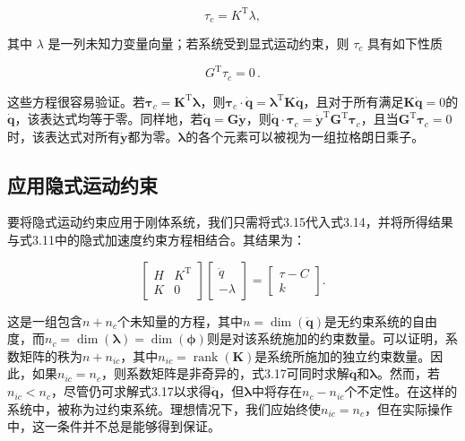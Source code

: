 \documentclass[10pt,a4paper]{book}
\theoremstyle{thmstyle} %
\theoremstyle{defstyle} %
\theoremstyle{prostyle} %
\begin{document}
$$
\tau _ { c } = K ^{\mathrm { T} } \lambda ,
$$



其中 $\lambda$ 是一列未知力变量向量；若系统受到显式运动约束，则 $\tau_{c}$ 具有如下性质



$$
G ^{\mathrm { T} } \tau _ { c } = 0 \, .
$$



这些方程很容易验证。若$\boldsymbol{\tau}_{c}=\boldsymbol{K}^{\mathrm{T}} \boldsymbol{\lambda}$，则$\boldsymbol{\tau}_{c} \cdot \dot{\boldsymbol{q}}=\boldsymbol{\lambda}^{\mathrm{T}} \boldsymbol{K} \dot{\boldsymbol{q}}$，且对于所有满足$\boldsymbol{K} \dot{\boldsymbol{q}}=0$的$\dot{\boldsymbol{q}}$，该表达式均等于零。同样地，若$\dot{\boldsymbol{q}}=\boldsymbol{G} \dot{\boldsymbol{y}}$，则$\dot{\boldsymbol{q}} \cdot \boldsymbol{\tau}_{c}=\dot{\boldsymbol{y}}^{\mathrm{T}} \boldsymbol{G}^{\mathrm{T}} \boldsymbol{\tau}_{c}$，且当$\boldsymbol{G}^{\mathrm{T}} \boldsymbol{\tau}_{c}=0$时，该表达式对所有$\dot{\boldsymbol{y}}$都为零。$\boldsymbol{\lambda}$的各个元素可以被视为一组拉格朗日乘子。



\subsection{应用隐式运动约束}





要将隐式运动约束应用于刚体系统，我们只需将式3.15代入式3.14，并将所得结果与式3.11中的隐式加速度约束方程相结合。其结果为：



$$
\left[ \begin{array}{ll} { H } & { K ^{\mathrm { T} } } \\{ K } & { 0 } \end{array} \right] \left[ \begin{array}{l} { \ddot { q } } \\{ - \lambda } \end{array} \right] = \left[ \begin{array}{l} { \tau - C } \\{ k } \end{array} \right] .
$$



这是一组包含$n+n_{c}$个未知量的方程，其中$n=\dim(\ddot{\boldsymbol{q}})$是无约束系统的自由度，而$n_{c}=\dim(\boldsymbol{\lambda})=\dim(\boldsymbol{\phi})$则是对该系统施加的约束数量。可以证明，系数矩阵的秩为$n+n_{ic}$，其中$n_{ic}=\operatorname{rank}(\boldsymbol{K})$是系统所施加的独立约束数量。因此，如果$n_{ic}=n_{c}$，则系数矩阵是非奇异的，式3.17可同时求解$\ddot{\boldsymbol{q}}$和$\boldsymbol{\lambda}$。然而，若$n_{ic}<n_{c}$，尽管仍可求解式3.17以求得$\ddot{\boldsymbol{q}}$，但$\boldsymbol{\lambda}$中将存在$n_{c}-n_{ic}$个不定性。在这样的系统中，被称为过约束系统。理想情况下，我们应始终使$n_{ic}=n_{c}$，但在实际操作中，这一条件并不总是能够得到保证。
\end{document}
